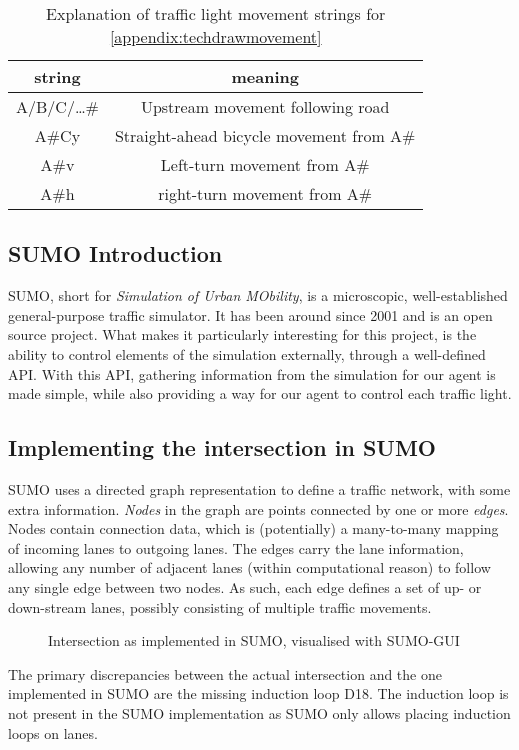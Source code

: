 \begin{table}[!htb]
  \centering
  \begin{tabular}{|c|c|}\hline
      string & meaning \\\hline
       A/B/C/\ldots\# & Upstream movement following road\\\hline
       A\#Cy & Straight-ahead bicycle movement from A\#\\\hline
       A\#v & Left-turn movement from A\#\\\hline
       A\#h & right-turn movement from A\#\\\hline
  \end{tabular}
  \caption{Explanation of traffic light movement strings for \cref{appendix:techdrawmovement}}
  \label{tab:intersectionmovements}
\end{table}
\subsection{SUMO Introduction}
SUMO, short for \textit{Simulation of Urban MObility}, is a microscopic, well-established general-purpose traffic simulator. It has been around since 2001 and is an open source project. What makes it particularly interesting for this project, is the ability to control elements of the simulation externally, through a well-defined API. With this API, gathering information from the simulation for our agent is made simple, while also providing a way for our agent to control each traffic light.

\subsection{Implementing the intersection in SUMO}
SUMO uses a directed graph representation to define a traffic network, with some extra information. 
\textit{Nodes} in the graph are points connected by one or more \textit{edges}. Nodes contain connection data, which is (potentially) a many-to-many mapping of incoming lanes to outgoing lanes. The edges carry the lane information, allowing any number of adjacent lanes (within computational reason) to follow any single edge between two nodes. As such, each edge defines a set of up- or down-stream lanes, possibly consisting of multiple traffic movements.


\begin{figure}[!htb]
  \centering
  \caption{Intersection as implemented in SUMO, visualised with SUMO-GUI}
  \label{fig:sumointerimpl}
\end{figure}
The primary discrepancies between the actual intersection and the one implemented in SUMO are the missing induction loop D18. The induction loop is not present in the SUMO implementation as SUMO only allows placing induction loops on lanes.

